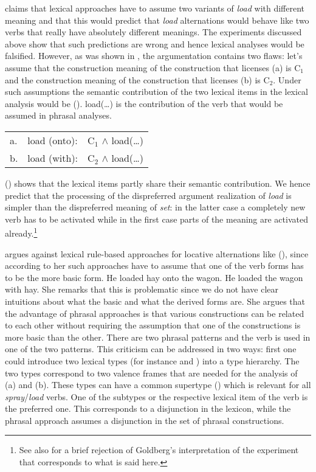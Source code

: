 \begin{exe}
\begin{xlist}[iv.]
\begin{exe}
\begin{xlist}[iv.]
\citet[]{Goldberg95a} claims that lexical approaches have to assume two variants of \emph{load}
with different meaning and that this would predict that \emph{load} alternations would behave like
two verbs that really have absolutely different meanings. The experiments discussed above show that
such predictions are wrong and hence lexical analyses would be falsified. However, as was shown in
, the argumentation contains two flaws: let's assume that the construction
meaning of the construction that licenses (a) is C$_1$ and the construction meaning of the
construction that licenses (b) is C$_2$. Under such assumptions the semantic contribution of
the two lexical items in the lexical analysis would be (). load(\ldots) is the contribution
of the verb that would be assumed in phrasal analyses.
\ea
\begin{tabular}[t]{@{}l@{~}l@{~}l@{}}
a. & load (onto): & C$_1$ $\wedge$ load(\ldots)\\
b. & load (with): & C$_2$ $\wedge$ load(\ldots)\\
\end{tabular}
\z
() shows that the lexical items partly share their semantic contribution. We hence predict
that the processing of the dispreferred argument realization of \emph{load} is simpler than the
dispreferred meaning of \emph{set}: in the latter case a completely new verb has to be activated
while in the first case parts of the meaning are activated already.\footnote{%
   See also  for a brief rejection of Goldberg's interpretation of the
   experiment that corresponds to what is said here.%
}

\citet[]{Goldberg95a} argues against lexical rule-based approaches for locative
alternations like (), since according to her such approaches have to assume that one of the verb forms has to be the more
basic form.
\eal
\ex He loaded hay onto the wagon.
\ex He loaded the wagon with hay.
\zl
She remarks that this is problematic since we do not have clear intuitions about what the basic and
what the derived forms are. She argues that the advantage of phrasal approaches is that various
constructions can be related to each other without requiring the assumption that one of the
constructions is more basic than the other. There are two phrasal patterns and the verb is used in
one of the two patterns. This criticism can be addressed in two ways: first one could introduce two
lexical types (for instance  and ) into a type hierarchy. The two
types correspond to two valence frames that are needed for the analysis of (a) and
(b). These types can have a common supertype () which is relevant for all
\emph{spray}/\emph{load} verbs. One of the subtypes or the respective lexical item of the verb is
the preferred one. This corresponds to a disjunction in the lexicon, while the phrasal approach
assumes a disjunction in the set of phrasal constructions. 


\end{xlist}
\end{exe}
\end{xlist}
\end{exe}
